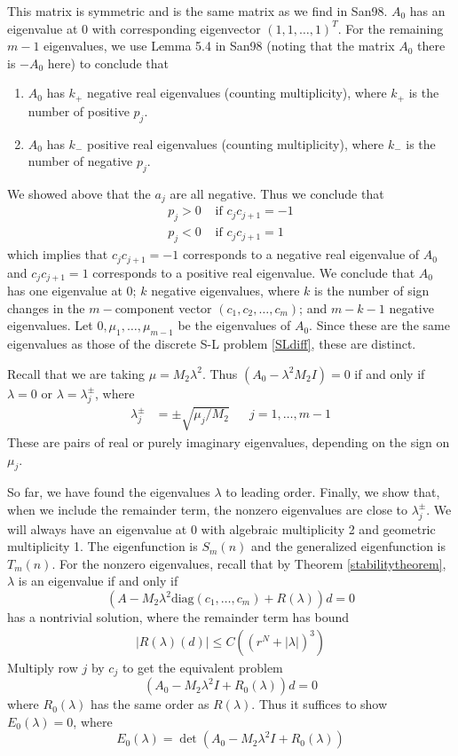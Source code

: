 \documentclass[12pt]{article}
\begin{document}
This matrix is symmetric and is the same matrix as we find in San98. $A_0$ has an eigenvalue at 0 with corresponding eigenvector $(1, 1, \dots, 1)^T$. For the remaining $m-1$ eigenvalues, we use Lemma 5.4 in San98 (noting that the matrix $A_0$ there is $-A_0$ here) to conclude that  
\begin{enumerate}
	\item $A_0$ has $k_+$ negative real eigenvalues (counting multiplicity), where $k_+$ is the number of positive $p_j$.
	\item $A_0$ has $k_-$ positive real eigenvalues (counting multiplicity), where $k_-$ is the number of negative $p_j$.
\end{enumerate}
We showed above that the $a_j$ are all negative. Thus we conclude that
\begin{align*}
p_j > 0 &\text{ if }c_j c_{j+1} = -1 \\
p_j < 0 &\text{ if }c_j c_{j+1} = 1
\end{align*}
which implies that $c_j c_{j+1} = -1$ corresponds to a negative real eigenvalue of $A_0$ and $c_j c_{j+1} = 1$ corresponds to a positive real eigenvalue. We conclude that $A_0$ has one eigenvalue at 0; $k$ negative eigenvalues, where $k$ is the number of sign changes in the $m-$component vector $(c_1, c_2, \dots, c_m)$; and $m - k - 1$ negative eigenvalues. Let $0, \mu_1, \dots, \mu_{m-1}$ be the eigenvalues of $A_0$. Since these are the same eigenvalues as those of the discrete S-L problem \eqref{SLdiff}, these are distinct. 

Recall that we are taking $\mu = M_2 \lambda^2$. Thus $(A_0 - \lambda^2 M_2 I) = 0$ if and only if $\lambda = 0$ or $\lambda = \lambda_j^\pm$, where 
\begin{align*}
\lambda_j^\pm &= \pm \sqrt{\mu_j / M_2} && j = 1, \dots, m-1
\end{align*}
These are pairs of real or purely imaginary eigenvalues, depending on the sign on $\mu_j$.

So far, we have found the eigenvalues $\lambda$ to leading order. Finally, we show that, when we include the remainder term, the nonzero eigenvalues are close to $\lambda_j^\pm$. We will always have an eigenvalue at 0 with algebraic multiplicity 2 and geometric multiplicity 1. The eigenfunction is $S_m(n)$ and the generalized eigenfunction is $T_m(n)$. For the nonzero eigenvalues, recall that by Theorem \ref{stabilitytheorem}, $\lambda$ is an eigenvalue if and only if 
\[
(A - M_2 \lambda^2 \text{diag}(c_1, \dots, c_m) + R(\lambda) )d = 0
\]
has a nontrivial solution, where the remainder term has bound
\begin{align*}
|R(\lambda)(d)| \leq C\left( (r^N + |\lambda|)^3 \right)
\end{align*}
Multiply row $j$ by $c_j$ to get the equivalent problem
\[
(A_0 - M_2 \lambda^2 I + R_0(\lambda))d = 0
\]
where $R_0(\lambda)$ has the same order as $R(\lambda)$. Thus it suffices to show $E_0(\lambda) = 0$, where
\[
E_0(\lambda) = \det (A_0 - M_2 \lambda^2 I + R_0(\lambda))
\]
\end{document}
